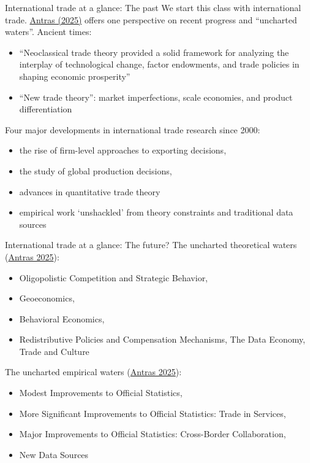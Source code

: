 \documentclass[10pt,notes=hide,aspectratio=169]{beamer}
\begin{document}
\begin{frame}{International trade at a glance: The past}
We start this class with international trade.
\href{https://doi.org/10.1093/jeea/jvae060}{Antras (2025)}
offers one perspective on recent progress and ``uncharted waters''.
Ancient times:
\begin{itemize}
\item ``Neoclassical trade theory provided a solid framework for analyzing the interplay of technological change, factor endowments, and trade policies in shaping economic prosperity''
\item ``New trade theory'': market imperfections, scale economies, and product differentiation
\end{itemize}
Four major developments in international trade research since 2000:
\begin{itemize}
\item the rise of firm-level approaches to exporting decisions, 
\item the study of global production decisions, 
\item advances in quantitative trade theory
\item empirical work `unshackled' from theory constraints and traditional data sources
\end{itemize}
\end{frame}
\begin{frame}{International trade at a glance: The future?}
The uncharted theoretical waters (\href{https://doi.org/10.1093/jeea/jvae060}{Antras 2025}):
\begin{itemize}
\item Oligopolistic Competition and Strategic Behavior,
\item Geoeconomics,
\item Behavioral Economics,
\item Redistributive Policies and Compensation Mechanisms, The Data Economy, Trade and Culture
\end{itemize}
The uncharted empirical waters (\href{https://doi.org/10.1093/jeea/jvae060}{Antras 2025}):
\begin{itemize}
\item Modest Improvements to Official Statistics,
\item More Significant Improvements to Official Statistics: Trade in Services,
\item Major Improvements to Official Statistics: Cross-Border Collaboration,
\item New Data Sources
\end{itemize}
\end{frame}
\end{document}
